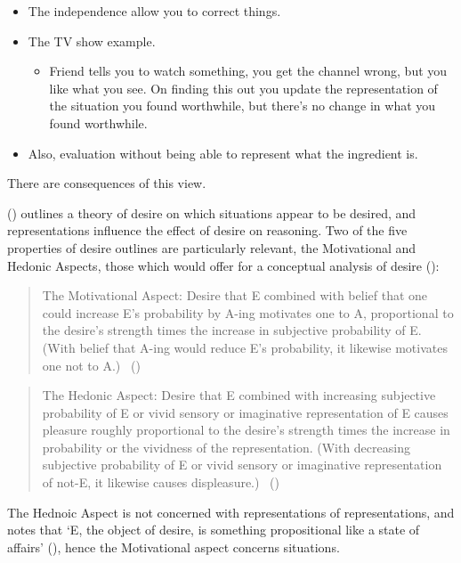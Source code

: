 \documentclass[10pt]{article}
\begin{document}
\begin{itemize}
\item The independence allow you to correct things.
\item The TV show example.
  \begin{itemize}
  \item Friend tells you to watch something, you get the channel wrong, but you like what you see.
    On finding this out you update the representation of the situation you found worthwhile, but there's no change in what you found worthwhile.
  \end{itemize}
\item Also, evaluation without being able to represent what the ingredient is.
\end{itemize}


There are consequences of this view.

\citeauthor{Sinhababu:2017aa} (\citeyear{Sinhababu:2017aa}) outlines a theory of desire on which situations appear to be desired, and representations influence the effect of desire on reasoning.
Two of the five properties of desire \citeauthor{Sinhababu:2017aa} outlines are particularly relevant, the Motivational and Hedonic Aspects, those which \citeauthor{Sinhababu:2017aa} would offer for a conceptual analysis of desire (\citeyear[32]{Sinhababu:2017aa}):
\begin{quote}
  The Motivational Aspect: \quad
  Desire that E combined with belief that one could increase E's probability by A-ing motivates one to A, proportional to the desire's strength times the increase in subjective probability of E.
  (With belief that A-ing would reduce E's probability, it likewise motivates one not to A.)\nolinebreak
  \mbox{ }\hfill(\citeyear[23]{Sinhababu:2017aa})
\end{quote}

\begin{quote}
  The Hedonic Aspect: \quad
  Desire that E combined with increasing subjective probability of E or vivid sensory or imaginative representation of E causes pleasure roughly proportional to the desire's strength times the increase in probability or the vividness of the representation.
  (With decreasing subjective probability of E or vivid sensory or imaginative representation of not-E, it likewise causes displeasure.)\nolinebreak
  \mbox{ }\hfill(\citeyear[28]{Sinhababu:2017aa})
\end{quote}
The Hednoic Aspect is not concerned with representations of representations, and \citeauthor{Sinhababu:2017aa} notes that `E, the object of desire, is something propositional like a state of affairs' (\citeyear[24]{Sinhababu:2017aa}), hence the Motivational aspect concerns situations.
\end{document}
